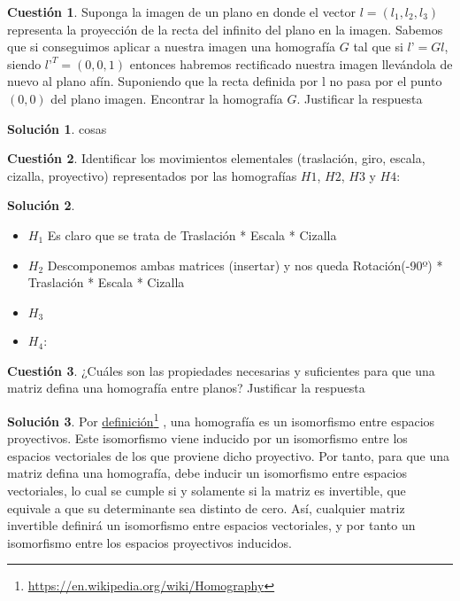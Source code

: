 \documentclass[a4paper, 11pt]{article}
\newcommand\fnurl[2]{%
  \href{#2}{#1}\footnote{\url{#2}}%
}
\theoremstyle{definition}
\newtheorem{cuestion}{Cuestión}
\newtheorem*{solucion}{Solución}
\begin{document}
  \begin{cuestion}
    Suponga la imagen de un plano en donde el vector $l=(l_1,l_2,l_3)$ representa
    la proyección de la recta del infinito del plano en la imagen. Sabemos que si
    conseguimos aplicar a nuestra imagen una homografía $G$ tal que si $l’= Gl$, siendo
    $l’^T =(0,0,1)$ entonces habremos rectificado nuestra imagen llevándola de nuevo
    al plano afín. Suponiendo que la recta definida por l no pasa por el punto $(0,0)$
    del plano imagen. Encontrar la homografía $G$. Justificar la respuesta

  \end{cuestion}

  \begin{solucion}
    cosas
  \end{solucion}

  \begin{cuestion}
    Identificar los movimientos elementales (traslación, giro, escala,
    cizalla, proyectivo) representados por las homografías $H1$, $H2$, $H3$ y $H4$:

  \end{cuestion}

  \begin{solucion}
      \begin{itemize}
        \item $H_1$
          Es claro que se trata de Traslación * Escala * Cizalla
        \item $H_2$
          Descomponemos ambas matrices (insertar) y nos queda Rotación(-90º) * Traslación * Escala * Cizalla
        \item $H_3$

        \item $H_4$:
      \end{itemize}
  \end{solucion}

  \begin{cuestion}
    ¿Cuáles son las propiedades necesarias y suficientes para que una matriz
    defina una homografía entre planos? Justificar la respuesta
  \end{cuestion}

  \begin{solucion}
      Por \fnurl{definición}{https://en.wikipedia.org/wiki/Homography}, una homografía
      es un isomorfismo entre espacios proyectivos. Este isomorfismo viene inducido
      por un isomorfismo entre los espacios vectoriales de los que proviene dicho proyectivo.
      Por tanto, para que una matriz defina una homografía, debe inducir un isomorfismo
      entre espacios vectoriales, lo cual se cumple si y solamente si la matriz es invertible,
      que equivale a que su determinante sea distinto de cero. Así, cualquier matriz invertible
      definirá un isomorfismo entre espacios vectoriales, y por tanto un isomorfismo entre
      los espacios proyectivos inducidos.
  \end{solucion}
\end{document}
